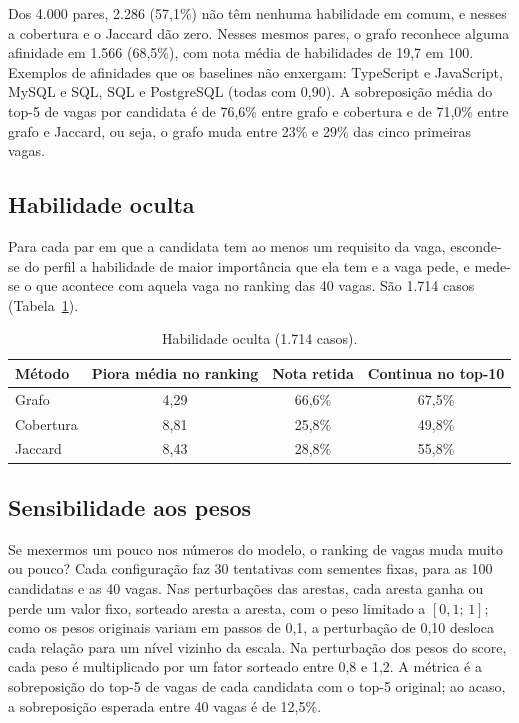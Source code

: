 \documentclass[12pt]{article}
\begin{document}
Dos 4.000 pares, 2.286 (57,1\%) não têm nenhuma habilidade em comum, e nesses a cobertura e o Jaccard dão zero. Nesses mesmos pares, o grafo reconhece alguma afinidade em 1.566 (68,5\%), com nota média de habilidades de 19,7 em 100. Exemplos de afinidades que os baselines não enxergam: TypeScript e JavaScript, MySQL e SQL, SQL e PostgreSQL (todas com 0,90). A sobreposição média do top-5 de vagas por candidata é de 76,6\% entre grafo e cobertura e de 71,0\% entre grafo e Jaccard, ou seja, o grafo muda entre 23\% e 29\% das cinco primeiras vagas.

\subsection{Habilidade oculta}

Para cada par em que a candidata tem ao menos um requisito da vaga, esconde-se do perfil a habilidade de maior importância que ela tem e a vaga pede, e mede-se o que acontece com aquela vaga no ranking das 40 vagas. São 1.714 casos (Tabela~\ref{tab:oculta}).

\begin{table}[ht]
\centering
\caption{Habilidade oculta (1.714 casos).}
\label{tab:oculta}
\begin{tabular}{lccc}
\hline
Método & Piora média no ranking & Nota retida & Continua no top-10 \\
\hline
Grafo & 4,29 & 66,6\% & 67,5\% \\
Cobertura & 8,81 & 25,8\% & 49,8\% \\
Jaccard & 8,43 & 28,8\% & 55,8\% \\
\hline
\end{tabular}
\end{table}

\subsection{Sensibilidade aos pesos}

Se mexermos um pouco nos números do modelo, o ranking de vagas muda muito ou pouco? Cada configuração faz 30 tentativas com sementes fixas, para as 100 candidatas e as 40 vagas. Nas perturbações das arestas, cada aresta ganha ou perde um valor fixo, sorteado aresta a aresta, com o peso limitado a $[0{,}1;\,1]$; como os pesos originais variam em passos de 0,1, a perturbação de 0,10 desloca cada relação para um nível vizinho da escala. Na perturbação dos pesos do score, cada peso é multiplicado por um fator sorteado entre 0,8 e 1,2. A métrica é a sobreposição do top-5 de vagas de cada candidata com o top-5 original; ao acaso, a sobreposição esperada entre 40 vagas é de 12,5\%.
\end{document}
